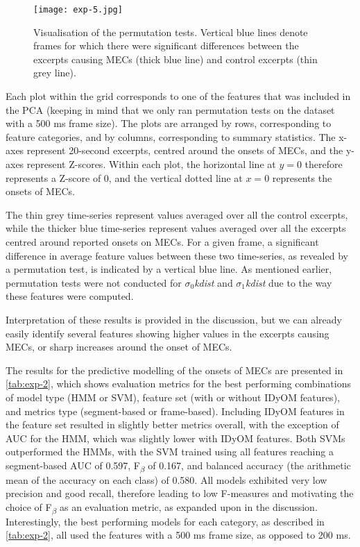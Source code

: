 \begin{figure}[t!]
\texttt{[image: exp-5.jpg]}
\centering
\caption{Visualisation of the permutation tests. Vertical blue lines denote frames for which there were significant differences between the excerpts causing MECs (thick blue line) and control excerpts (thin grey line).}
\label{fig:exp-5}
\end{figure}

Each plot within the grid corresponds to one of the features that was included in the PCA (keeping in mind that we only ran permutation tests on the dataset with a 500 ms frame size). The plots are arranged by rows, corresponding to feature categories, and by columns, corresponding to summary statistics. The x-axes represent 20-second excerpts, centred around the onsets of MECs, and the y-axes represent Z-scores. Within each plot, the horizontal line at $y = 0$ therefore represents a Z-score of 0, and the vertical dotted line at $x = 0$ represents the onsets of MECs.

The thin grey time-series represent values averaged over all the control excerpts, while the thicker blue time-series represent values averaged over all the excerpts centred around reported onsets on MECs. For a given frame, a significant difference in average feature values between these two time-series, as revealed by a permutation test, is indicated by a vertical blue line. As mentioned earlier, permutation tests were not conducted for $\sigma_0$\emph{kdist} and $\sigma_1$\emph{kdist} due to the way these features were computed.

Interpretation of these results is provided in the discussion, but we can already easily identify several features showing higher values in the excerpts causing MECs, or sharp increases around the onset of MECs.

The results for the predictive modelling of the onsets of MECs are presented in \autoref{tab:exp-2}, which shows evaluation metrics for the best performing combinations of model type (HMM or SVM), feature set (with or without IDyOM features), and metrics type (segment-based or frame-based). Including IDyOM features in the feature set resulted in slightly better metrics overall, with the exception of AUC for the HMM, which was slightly lower with IDyOM features. Both SVMs outperformed the HMMs, with the SVM trained using all features reaching a segment-based AUC of 0.597, F\textsubscript{$\beta$} of 0.167, and balanced accuracy (the arithmetic mean of the accuracy on each class) of 0.580. All models exhibited very low precision and good recall, therefore leading to low F-measures and motivating the choice of F\textsubscript{$\beta$} as an evaluation metric, as expanded upon in the discussion. Interestingly, the best performing models for each category, as described in \autoref{tab:exp-2}, all used the features with a 500 ms frame size, as opposed to 200 ms.

